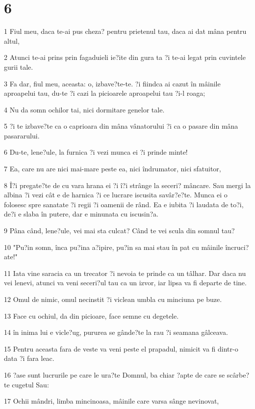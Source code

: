 \chapter{6}

\par 1 Fiul meu, daca te-ai pus cheza? pentru prietenul tau, daca ai dat mâna pentru altul,
\par 2 Atunci te-ai prins prin fagaduieli ie?ite din gura ta ?i te-ai legat prin cuvintele gurii tale.
\par 3 Fa dar, fiul meu, aceasta: o, izbave?te-te. ?i fiindca ai cazut în mâinile aproapelui tau, du-te ?i cazi la picioarele aproapelui tau ?i-l roaga;
\par 4 Nu da somn ochilor tai, nici dormitare genelor tale.
\par 5 ?i te izbave?te ca o caprioara din mâna vânatorului ?i ca o pasare din mâna pasararului.
\par 6 Du-te, lene?ule, la furnica ?i vezi munca ei ?i prinde minte!
\par 7 Ea, care nu are nici mai-mare peste ea, nici îndrumator, nici sfatuitor,
\par 8 Î?i pregate?te de cu vara hrana ei ?i î?i strânge la seceri? mâncare. Sau mergi la albina ?i vezi cât e de harnica ?i ce lucrare iscusita savâr?e?te. Munca ei o folosesc spre sanatate ?i regii ?i oamenii de rând. Ea e iubita ?i laudata de to?i, de?i e slaba în putere, dar e minunata cu iscusin?a.
\par 9 Pâna când, lene?ule, vei mai sta culcat? Când te vei scula din somnul tau?
\par 10 "Pu?in somn, înca pu?ina a?ipire, pu?in sa mai stau în pat cu mâinile încruci?ate!"
\par 11 Iata vine saracia ca un trecator ?i nevoia te prinde ca un tâlhar. Dar daca nu vei lenevi, atunci va veni seceri?ul tau ca un izvor, iar lipsa va fi departe de tine.
\par 12 Omul de nimic, omul necinstit ?i viclean umbla cu minciuna pe buze.
\par 13 Face cu ochiul, da din picioare, face semne cu degetele.
\par 14 în inima lui e vicle?ug, pururea se gânde?te la rau ?i seamana gâlceava.
\par 15 Pentru aceasta fara de veste va veni peste el prapadul, nimicit va fi dintr-o data ?i fara leac.
\par 16 ?ase sunt lucrurile pe care le ura?te Domnul, ba chiar ?apte de care se scârbe?te cugetul Sau:
\par 17 Ochii mândri, limba mincinoasa, mâinile care varsa sânge nevinovat,

